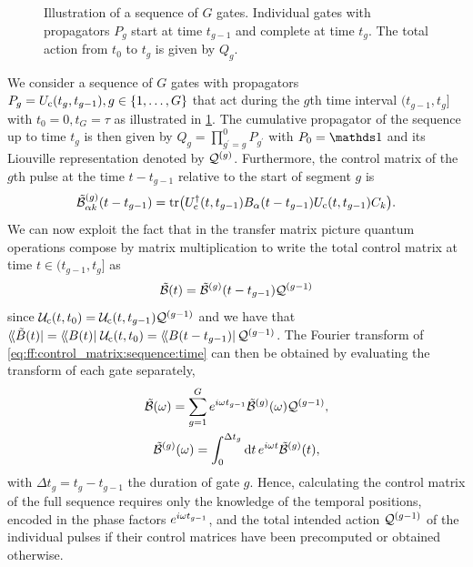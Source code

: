\begin{figure}
    \centering
    
    \caption[Illustration of gate sequence]{
        Illustration of a sequence of $G$ gates.
        Individual gates with propagators $P_g$ start at time $t_{g-1}$ and complete at time $t_g$.
        The total action from $t_0$ to $t_g$ is given by $Q_g$.
    }
    \label{fig:ff:gatesequence}
\end{figure}

We consider a sequence of $G$ gates with propagators $P_g = U_{\mathrm{c}}(t_g, t_{g-1}), g\in\lbrace 1,\dotsc,G\rbrace$ that act during the $g$th time interval $(t_{g-1}, t_g]$ with $t_0 =  0, t_G = \tau$ as illustrated in \cref{fig:ff:gatesequence}.
The cumulative propagator of the sequence up to time $t_g$ is then given by $Q_g = \prod_{g^\prime=g}^0 P_{g^\prime}$ with $P_0 = \eye$ and its Liouville representation denoted by $\mathcal{Q}^{(g)}$.
Furthermore, the control matrix of the $g$th pulse at the time $t - t_{g-1}$ relative to the start of segment $g$ is
\begin{equation}\label{eq:ff:control_matrix:pulse:time}
    \tilde{\mathcal{B}}^{(g)}_{\alpha k}(t - t_{g-1}) = \tr(U_{\mathrm{c}}^\dagger(t, t_{g-1})B_\alpha(t - t_{g-1}) U_{\mathrm{c}}(t, t_{g-1}) C_k).
\end{equation}
We can now exploit the fact that in the transfer matrix picture quantum operations compose by matrix multiplication to write the total control matrix at time $t\in (t_{g-1}, t_g]$ as
\begin{equation}\label{eq:ff:control_matrix:sequence:time}
    \tilde{\mathcal{B}}(t) = \tilde{\mathcal{B}}^{(g)}(t - t_{g-1})\mathcal{Q}^{(g-1)}
\end{equation}
since $\mathcal{U}_{\mathrm{c}}(t, t_0) = \mathcal{U}_{\mathrm{c}}(t, t_{g-1})\mathcal{Q}^{(g-1)}$ and we have that $\dbra*{\tilde{B}(t)} = \dbra{B(t)}\liouvUc(t, t_0) \allowbreak = \dbra*{B(t - t_{g-1})}\liouvQ\gth{g-1}$.
The Fourier transform of \cref{eq:ff:control_matrix:sequence:time} can then be obtained by evaluating the transform of each gate separately,
\begin{gather}
    \tilde{\mathcal{B}}(\omega) = \sum_{g = 1}^G e^{i\omega t_{g-1}}\tilde{\mathcal{B}}^{(g)}(\omega)\mathcal{Q}^{(g-1)} \label{eq:ff:control_matrix:sequence:freq}, \\
    \tilde{\mathcal{B}}^{(g)}(\omega) = \int_0^{\Delta t_g}\dd{t}e^{i\omega t}\tilde{\mathcal{B}}^{(g)}(t), \label{eq:ff:control_matrix:pulse:freq}
\end{gather}
with $\Delta t_g = t_g - t_{g-1}$ the duration of gate $g$.
Hence, calculating the control matrix of the full sequence requires only the knowledge of the temporal positions, encoded in the phase factors $e^{i\omega t_{g-1}}$, and the total intended action $\mathcal{Q}^{(g-1)}$ of the individual pulses if their control matrices have been precomputed or obtained otherwise.

